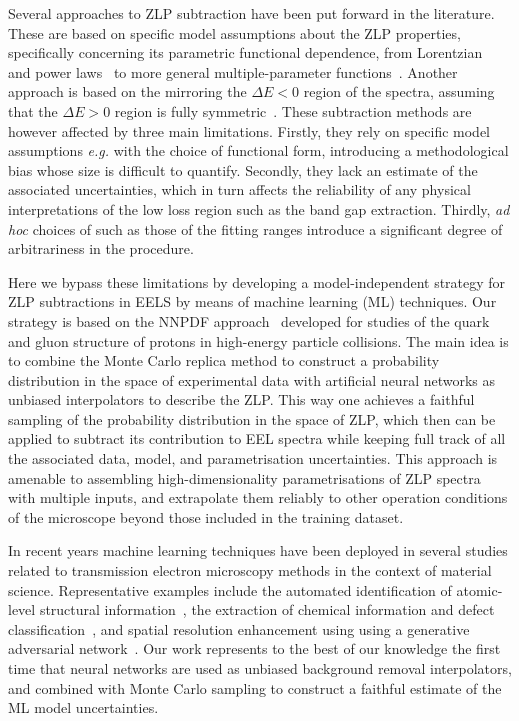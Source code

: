 Several approaches to ZLP subtraction have been put forward in the literature.
%
These are based on specific model assumptions about the ZLP properties, specifically
concerning its parametric functional dependence, from Lorentzian~\cite{Dorneich:1998}
and power laws~\cite{Erni:2005} to more general multiple-parameter functions~\cite{Benthem:2001}.
%
Another approach is based on the mirroring the $\Delta E <0$ region of the spectra, assuming
that the $\Delta E>0$ region is fully symmetric~\cite{Lazar:2003}.
%
These  subtraction methods are however affected by three main limitations.
%
Firstly, they rely on specific model assumptions {\it e.g.} with
the choice of functional form, introducing a methodological
bias whose size is difficult to quantify.
%
Secondly, they lack an estimate of the associated uncertainties, which in turn affects
the reliability of any physical interpretations of the low loss region such as the band gap extraction.
%
Thirdly, {\it ad hoc} choices of such as those of the fitting ranges introduce a significant degree of
arbitrariness in the procedure.

Here we bypass these limitations by developing a model-independent strategy
for ZLP subtractions in EELS by means of machine learning (ML) techniques.
%
Our strategy is based on the NNPDF approach~\cite{Ball:2008by,Ball:2012cx,Ball:2014uwa,Ball:2017nwa}
developed for studies
of the quark and gluon structure of protons in high-energy particle collisions.
%
The main idea is to combine the  Monte Carlo replica  method to construct a probability
distribution in the space of experimental data with artificial
neural networks as unbiased interpolators to describe the ZLP.
%
This way one achieves
a faithful sampling of the probability distribution in the space of ZLP,
which then can be applied to subtract its contribution to EEL spectra while keeping
full track of all the associated
data, model, and parametrisation uncertainties.
%
This approach is amenable to assembling high-dimensionality parametrisations
of ZLP spectra with multiple inputs, and extrapolate them reliably
to other operation conditions of the microscope beyond those included
in the training dataset.

In recent years
machine learning techniques have been deployed in several studies
related to transmission electron microscopy methods
in the context of material science.
%
Representative examples
include the automated identification
of atomic-level structural information~\cite{10.1145/2834892.2834896},
the extraction of chemical information
and defect classification~\cite{doi:10.1021/acsnano.7b07504},
and spatial resolution enhancement
using  using a generative adversarial network~\cite{cite-key}.
%
Our work represents to the best of our knowledge
the first time that neural networks are used as 
 unbiased
background removal interpolators, and combined with Monte Carlo sampling to construct a faithful estimate
of the ML model uncertainties.

